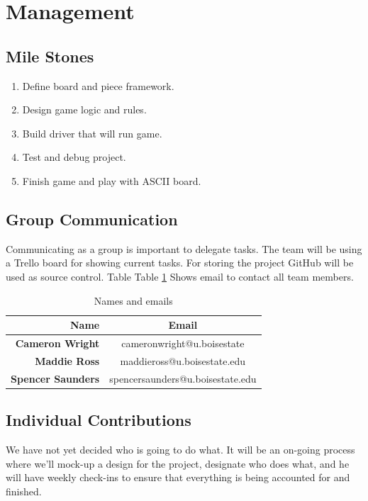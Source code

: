 \documentclass[a4paper]{article}
\begin{document}
\section{Management}

\subsection{Mile Stones}

\begin{enumerate}
\item Define board and piece framework.
\item Design game logic and rules.
\item Build driver that will run game.
\item Test and debug project.
\item Finish game and play with ASCII board.
\end{enumerate}

\subsection{Group Communication}

Communicating as a group is important to delegate tasks.  The team will be using a Trello board for showing current tasks.  For storing the project GitHub will be used as source control.  Table Table \ref{tab:contacts} Shows email to contact all team members.

\begin{table}[ht]
\centering
\small
 \begin{tabular}{r|c}
\hline
\textbf{Name} & \textbf{Email}\\
\hline
\textbf{Cameron Wright}  & cameronwright@u.boisestate   \\
\textbf{Maddie Ross}    & maddieross@u.boisestate.edu   \\
\textbf{Spencer Saunders}    & spencersaunders@u.boisestate.edu  \\
\end{tabular}
\caption{Names and emails}
\label{tab:contacts}
\end{table}

\subsection{Individual Contributions}

We have not yet decided who is going to do what. It will be an on-going process where we'll mock-up a design for the project, designate who does what, and he will have weekly check-ins to ensure that everything is being accounted for and finished. 



\end{document}
